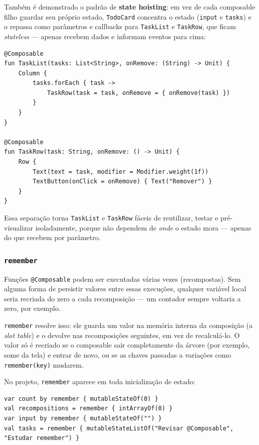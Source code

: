 \documentclass[11pt,a4paper]{article}
\begin{document}
Também é demonstrado o padrão de \textbf{state hoisting}: em vez de cada
composable filho guardar seu próprio estado, \texttt{TodoCard} concentra
o estado (\texttt{input} e \texttt{tasks}) e o repassa como parâmetros e
callbacks para \texttt{TaskList} e \texttt{TaskRow}, que ficam
\emph{stateless} — apenas recebem dados e informam eventos para cima:

\begin{lstlisting}[caption={State hoisting: pai com estado, filhos sem estado}, label=lst:hoisting]
@Composable
fun TaskList(tasks: List<String>, onRemove: (String) -> Unit) {
    Column {
        tasks.forEach { task ->
            TaskRow(task = task, onRemove = { onRemove(task) })
        }
    }
}

@Composable
fun TaskRow(task: String, onRemove: () -> Unit) {
    Row {
        Text(text = task, modifier = Modifier.weight(1f))
        TextButton(onClick = onRemove) { Text("Remover") }
    }
}
\end{lstlisting}

Essa separação torna \texttt{TaskList} e \texttt{TaskRow} fáceis de
reutilizar, testar e pré-visualizar isoladamente, porque não dependem de
\emph{onde} o estado mora — apenas do que recebem por parâmetro.

\subsubsection{\texttt{remember}}

Funções \texttt{@Composable} podem ser executadas várias vezes
(recompostas). Sem alguma forma de persistir valores entre essas
execuções, qualquer variável local seria recriada do zero a cada
recomposição — um contador sempre voltaria a zero, por exemplo.

\texttt{remember} resolve isso: ele guarda um valor na memória interna da
composição (a \emph{slot table}) e o devolve nas recomposições
seguintes, em vez de recalculá-lo. O valor só é recriado se o composable
sair completamente da árvore (por exemplo, some da tela) e entrar de
novo, ou se as chaves passadas a variações como \texttt{remember(key)}
mudarem.

No projeto, \texttt{remember} aparece em toda inicialização de estado:

\begin{lstlisting}[caption={remember preservando estado entre recomposições}, label=lst:remember]
var count by remember { mutableStateOf(0) }
val recompositions = remember { intArrayOf(0) }
var input by remember { mutableStateOf("") }
val tasks = remember { mutableStateListOf("Revisar @Composable", "Estudar remember") }
\end{lstlisting}
\end{document}
